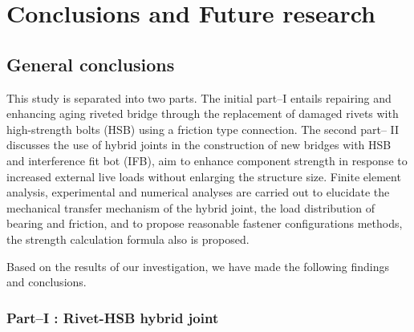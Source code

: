 \chapter{Conclusions and Future research}
\label{ch8}

\begin{spacing}{1.25} %
\minitoc %
\end{spacing} %
\onehalfspacing %

\section{General conclusions}

This study is separated into two parts. The initial part--\RN{1} entails repairing and enhancing aging riveted bridge through the replacement of damaged rivets with high-strength bolts (HSB) using a friction type connection. The second part-- \RN{2} discusses the use of hybrid joints in the construction of new bridges with HSB and interference fit bot (IFB), aim to enhance component strength in response to increased external live loads without enlarging the structure size. Finite element analysis, experimental and numerical analyses are carried out to elucidate the mechanical transfer mechanism of the hybrid joint, the load distribution of bearing and friction, and to propose reasonable fastener configurations methods, the strength calculation formula also is proposed.

Based on the results of our investigation, we have made the following findings and conclusions. \par

\subsection*{Part--\RN{1} : Rivet-HSB hybrid joint}


